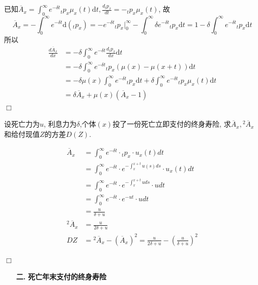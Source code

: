 \documentclass[a4paper,10pt]{ctexbook}
\newcommand{\hei}{\CJKfamily{hei}}      %
\def\qed{\hfill$\Box$\medskip}
\begin{document}
已知$\overline{A}_x=\int_0^\infty e^{-\delta t}{}_tp_x\mu_x(t)\mathrm{d}t, \frac{d{}_tp_x}{dt} = -{}_tp_x\mu_x(t)$, 故
$$
    \overline{A}_x=-\int_0^\infty e^{-\delta t}\mathrm{d}({}_tp_x) = -e^{-\delta t}{}_tp_x|_0^\infty -\int_0^\infty \delta e^{-\delta t}{}_tp_x\mathrm{d}t = 1 - \delta \int_0^\infty e^{-\delta t}{}_tp_x\mathrm{d}t
$$
所以
\begin{align*}
    \frac{d\overline{A}_x}{dx} & = -\delta \int_0^\infty e^{-\delta t}\frac{d{}_tp_x}{dx}\mathrm{d}t                                                            \\
                               & = -\delta \int_0^\infty e^{-\delta t}{}_tp_x(\mu(x) - \mu(x+t))\mathrm{d}t                                                     \\
                               & = -\delta \mu(x) \int_0^\infty e^{-\delta t}{}_tp_x\mathrm{d}t + \delta \int_0^\infty e^{-\delta t}{}_tp_x \mu_x(t)\mathrm{d}t \\
                               & = \delta \overline{A}_x + \mu(x)(\overline{A}_x - 1)
\end{align*}
\qed
\begin{example}
    设死亡力为$u$, 利息力为$\delta$,个体$(x)$投了一份死亡立即支付的终身寿险, 求$\overline{A}_{x}, {}^2\overline{A}_{x} $和给付现值$Z$的方差$D(Z)$.

    \solution
    \begin{align*}
        \overline{A}_{x}     & =\int_0^{\infty}e^{-\delta t}\cdot {}_tp_x\cdot u_x(t)dt                                \\
                             & =\int_0^{\infty}e^{-\delta t}\cdot e^{-\int_x^{x+t}u(s)ds}\cdot u_x(t)dt                \\
                             & =\int_0^{\infty}e^{-\delta t}\cdot e^{-\int_x^{x+t}uds}\cdot udt                        \\
                             & =\int_0^{\infty}e^{-\delta t}\cdot e^{-ut}\cdot udt                                     \\
                             & =\frac{u}{\delta +u}                                                                    \\
        {}^2\overline{A}_{x} & =\frac{u}{2\delta +u}                                                                   \\
        DZ                   & ={}^2\overline{A}_{x}-(\overline{A}_{x})^2=\frac{u}{2\delta +u}-(\frac{u}{\delta +u})^2
    \end{align*}
\end{example}
\qed
\begin{itemize}
    \item[{\bf\hei 二.}]{\bf\hei 死亡年末支付的终身寿险}
\end{itemize}
\end{document}
